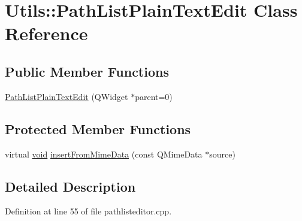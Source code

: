 \hypertarget{class_utils_1_1_path_list_plain_text_edit}{\section{\-Utils\-:\-:\-Path\-List\-Plain\-Text\-Edit \-Class \-Reference}
\label{class_utils_1_1_path_list_plain_text_edit}
}
\subsection*{\-Public \-Member \-Functions}
\begin{DoxyCompactItemize}
\item 
\hyperlink{class_utils_1_1_path_list_plain_text_edit_aa70aad84201092e4c61bef00397cad79}{\-Path\-List\-Plain\-Text\-Edit} (\-Q\-Widget $\ast$parent=0)
\end{DoxyCompactItemize}
\subsection*{\-Protected \-Member \-Functions}
\begin{DoxyCompactItemize}
\item 
virtual \hyperlink{group___u_a_v_objects_plugin_ga444cf2ff3f0ecbe028adce838d373f5c}{void} \hyperlink{class_utils_1_1_path_list_plain_text_edit_adcdbdbbe651b3482f0edde0fe096d6e4}{insert\-From\-Mime\-Data} (const \-Q\-Mime\-Data $\ast$source)
\end{DoxyCompactItemize}


\subsection{\-Detailed \-Description}


\-Definition at line 55 of file pathlisteditor.\-cpp.



